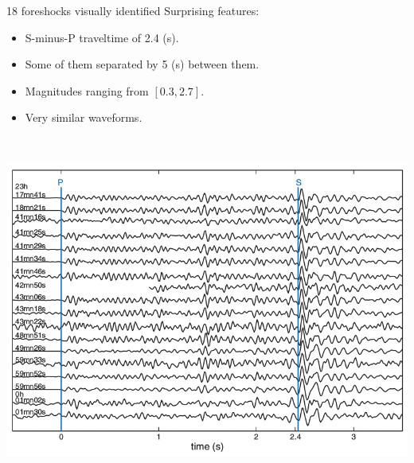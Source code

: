 \documentclass[aspectratio=43,9pt]{beamer}
\begin{document}
\begin{frame}{18 foreshocks visually identified}
   \vskip -0.3cm
   Surprising features: \\
   \vskip 0.2cm
 \begin{minipage}{0.45\linewidth}
   \begin{itemize}
    \item S-minus-P traveltime of 2.4 (s).
    \item Some of them separated by 5 (s) between them.
   \end{itemize}
 \end{minipage}
 \begin{minipage}{0.45\linewidth}
   \begin{itemize}
    \item Magnitudes ranging from $[0.3, 2.7]$.
    \item Very similar waveforms.
   \end{itemize}
 \end{minipage} \\
 \begin{center}
  \includegraphics[width=0.7\linewidth]{Figs/fig2.jpg}  
 \end{center}

\end{frame}
\end{document}
